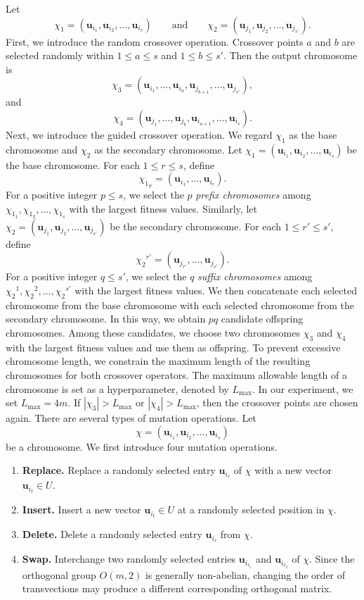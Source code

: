 \documentclass{article}
\begin{document}
Let
\[ \chi_1=(\mathbf{u}_{i_1}, \mathbf{u}_{i_2}, \ldots, \mathbf{u}_{i_s}) \qquad \text{and} \qquad \chi_2=(\mathbf{u}_{j_1}, \mathbf{u}_{j_2}, \ldots, \mathbf{u}_{j_{s'}}).\]
First, we introduce the random crossover operation. Crossover points $a$ and $b$ are selected randomly within $1 \leq a \leq s$ and $1 \leq b \leq s'$. Then the output chromosome is \[
\chi_3 = (\mathbf{u}_{i_1}, \ldots, \mathbf{u}_{i_a},\mathbf{u}_{j_{b+1}}, \ldots, \mathbf{u}_{j_{s'}}),
\]
and
\[
\chi_4 = (\mathbf{u}_{j_1}, \ldots, \mathbf{u}_{j_b},\mathbf{u}_{i_{a+1}}, \ldots, \mathbf{u}_{i_{s}}).
\]
Next, we introduce the guided crossover operation. We regard $\chi_1$ as the base chromosome and $\chi_2$ as the secondary chromosome. Let $\chi_1=(\mathbf{u}_{i_1},\mathbf{u}_{i_2},\ldots,\mathbf{u}_{i_s})$ be the base chromosome. For each $1\leq r\leq s$, define
\[
{\chi_1}_r=(\mathbf{u}_{i_1},\ldots,\mathbf{u}_{i_r}).
\]
For a positive integer $p\leq s$, we select the $p$ \textit{prefix chromosomes} among $\chi_{1_1},\chi_{1_2},\ldots,\chi_{1_s}$ with the largest fitness values. Similarly, let $\chi_2=(\mathbf{u}_{j_1},\mathbf{u}_{j_2},\ldots,\mathbf{u}_{j_{s'}})$ be the secondary chromosome. For each $1\leq r'\leq s'$, define
\[
{\chi_2}^{r'}=(\mathbf{u}_{j_{r'}},\ldots,\mathbf{u}_{j_{s'}}).
\]
For a positive integer $q\leq s'$, we select the $q$ \textit{suffix chromosomes} among ${\chi_2}^1,{\chi_2}^2,\ldots,{\chi_2}^{s'}$ with the largest fitness values. We then concatenate each selected chromosome from the base chromosome with each selected chromosome from the secondary chromosome. In this way, we obtain $pq$ candidate offspring chromosomes. Among these candidates, we choose two chromosomes $\chi_3$ and $\chi_4$ with the largest fitness values and use them as offspring.
To prevent excessive chromosome length, we constrain the maximum length of the resulting chromosomes for both crossover operators. The maximum allowable length of a chromosome is set as a hyperparameter, denoted by $L_{\max}$. In our experiment, we set $L_{\max}=4m$. If $|\chi_3|>L_{\max}$ or $|\chi_4|>L_{\max}$, then the crossover points are chosen again.
There are several types of mutation operations. Let
\[
\chi=(\mathbf{u}_{i_1},\mathbf{u}_{i_2},\ldots,\mathbf{u}_{i_s})
\]
be a chromosome. We first introduce four mutation operations.
\begin{enumerate}
    \item \textbf{Replace.} Replace a randomly selected entry $\mathbf{u}_{i_\ell}$ of $\chi$ with a new vector $\mathbf{u}_{i_t}\in U$.

    \item \textbf{Insert.} Insert a new vector $\mathbf{u}_{i_t}\in U$ at a randomly selected position in $\chi$.

    \item \textbf{Delete.} Delete a randomly selected entry $\mathbf{u}_{i_\ell}$ from $\chi$.

    \item \textbf{Swap.} Interchange two randomly selected entries $\mathbf{u}_{i_{\ell_1}}$ and $\mathbf{u}_{i_{\ell_2}}$ of $\chi$. Since the orthogonal group $O(m,2)$ is generally non-abelian, changing the order of transvections may produce a different corresponding orthogonal matrix.
\end{enumerate}
\end{document}
